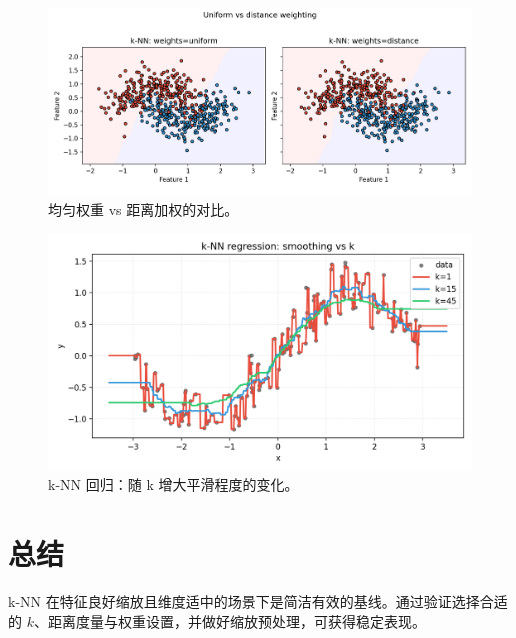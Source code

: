 \documentclass[UTF8,zihao=-4]{ctexart}
\begin{document}
\begin{figure}[H]
  \centering
  \includegraphics[width=0.95\linewidth]{knn_weight_compare.png}
  \caption{均匀权重 vs 距离加权的对比。}
  \label{fig:knn_weight_cn}
\end{figure}
\FloatBarrier

\begin{figure}[H]
  \centering
  \includegraphics[width=0.85\linewidth]{knn_regression_curve.png}
  \caption{k-NN 回归：随 k 增大平滑程度的变化。}
  \label{fig:knn_reg_cn}
\end{figure}
\FloatBarrier

\section{总结}
k-NN 在特征良好缩放且维度适中的场景下是简洁有效的基线。通过验证选择合适的 $k$、距离度量与权重设置，并做好缩放预处理，可获得稳定表现。
\end{document}
